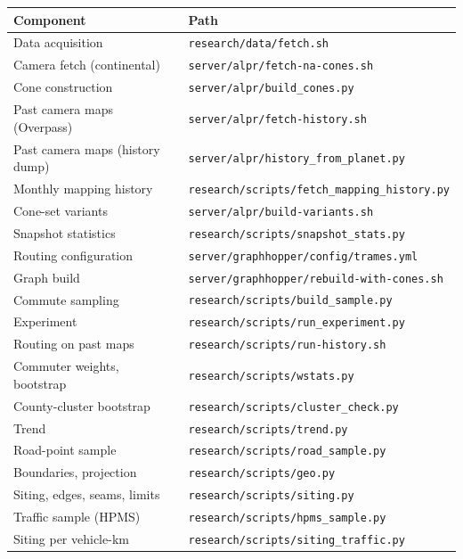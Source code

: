 \documentclass[11pt,twoside]{article}
\begin{document}
\begin{table}[htbp]
\centering
\small
\begin{tabular}{ll}
\toprule
Component & Path \\
\midrule
Data acquisition            & \texttt{research/data/fetch.sh} \\
Camera fetch (continental)  & \texttt{server/alpr/fetch-na-cones.sh} \\
Cone construction           & \texttt{server/alpr/build\_cones.py} \\
Past camera maps (Overpass)  & \texttt{server/alpr/fetch-history.sh} \\
Past camera maps (history dump) & \texttt{server/alpr/history\_from\_planet.py} \\
Monthly mapping history     & \texttt{research/scripts/fetch\_mapping\_history.py} \\
Cone-set variants           & \texttt{server/alpr/build-variants.sh} \\
Snapshot statistics         & \texttt{research/scripts/snapshot\_stats.py} \\
Routing configuration       & \texttt{server/graphhopper/config/trames.yml} \\
Graph build                 & \texttt{server/graphhopper/rebuild-with-cones.sh} \\
Commute sampling            & \texttt{research/scripts/build\_sample.py} \\
Experiment                  & \texttt{research/scripts/run\_experiment.py} \\
Routing on past maps        & \texttt{research/scripts/run-history.sh} \\
Commuter weights, bootstrap & \texttt{research/scripts/wstats.py} \\
County-cluster bootstrap    & \texttt{research/scripts/cluster\_check.py} \\
Trend                       & \texttt{research/scripts/trend.py} \\
Road-point sample           & \texttt{research/scripts/road\_sample.py} \\
Boundaries, projection      & \texttt{research/scripts/geo.py} \\
Siting, edges, seams, limits & \texttt{research/scripts/siting.py} \\
Traffic sample (HPMS)       & \texttt{research/scripts/hpms\_sample.py} \\
Siting per vehicle-km       & \texttt{research/scripts/siting\_traffic.py} \\

\end{tabular}
\end{table}
\end{document}
